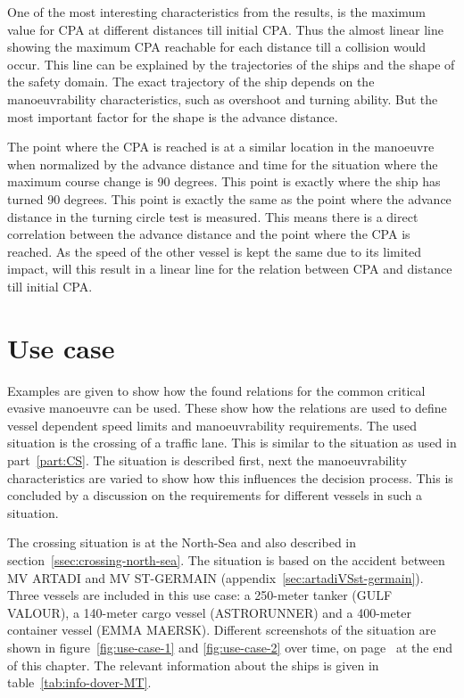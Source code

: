 One of the most interesting characteristics from the results, is the maximum value for \ac{CPA} at different distances till initial \ac{CPA}. Thus the almost linear line showing the maximum CPA reachable for each distance till a collision would occur. This line can be explained by the trajectories of the ships and the shape of the safety domain. 
The exact trajectory of the ship depends on the manoeuvrability characteristics, such as overshoot and turning ability. But the most important factor for the shape is the advance distance.

The point where the \ac{CPA} is reached is at a similar location in the manoeuvre when normalized by the advance distance and time for the situation where the maximum course change is 90 degrees. This point is exactly where the ship has turned 90 degrees. This point is exactly the same as the point where the advance distance in the turning circle test is measured. This means there is a direct correlation between the advance distance and the point where the CPA is reached. As the speed of the other vessel is kept the same due to its limited impact, will this result in a linear line for the relation between CPA and distance till initial CPA.

\section{Use case}
Examples are given to show how the found relations for the common critical evasive manoeuvre can be used. These show how the relations are used to define vessel dependent speed limits and manoeuvrability requirements. The used situation is the crossing of a traffic lane. This is similar to the situation as used in part~\ref{part:CS}. The situation is described first, next the manoeuvrability characteristics are varied to show how this influences the decision process. This is concluded by a discussion on the requirements for different vessels in such a situation.

The crossing situation is at the North-Sea and also described in section~\ref{ssec:crossing-north-sea}. The situation is based on the accident between MV ARTADI and MV ST-GERMAIN (appendix~\ref{sec:artadiVSst-germain}). Three vessels are included in this use case: a 250-meter tanker (GULF VALOUR), a 140-meter cargo vessel (ASTRORUNNER) and a 400-meter container vessel (EMMA MAERSK). Different screenshots of the situation are shown in figure~\ref{fig:use-case-1} and \ref{fig:use-case-2} over time, on page~\pageref{fig:use-case-1} at the end of this chapter. The relevant information about the ships is given in table~\ref{tab:info-dover-MT}.

